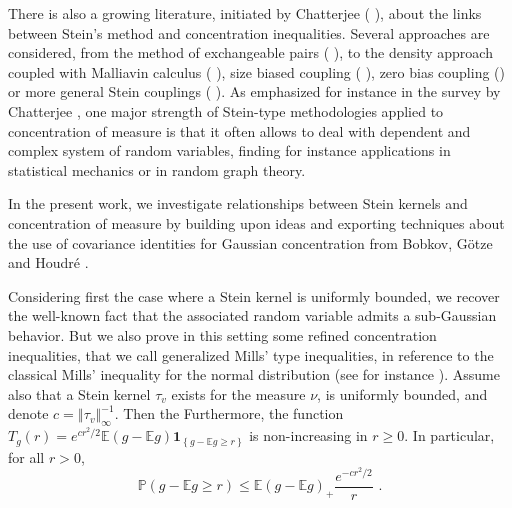 \documentclass[11pt]{article}
\begin{document}
There is also a growing literature, initiated by Chatterjee (\cite{MR2288072}%
), about the links between Stein's method and concentration inequalities.
Several approaches are considered, from the method of exchangeable pairs (%
\cite{MR2288072,MR2683635, MR3189061,  MR3551202}%
), to the density approach coupled with Malliavin calculus (%
\cite{MR2556018, MR2568291, MR3380095, MR3352331}%
), size biased coupling (%
\cite{MR2773032,MR2763529,MR2832913,MR3758727}%
), zero bias coupling (\cite{MR3162712}) or more general Stein couplings (%
\cite{barbour2018central}). As emphasized for instance in the survey by
Chatterjee \cite{MR3727600}, one major strength of Stein-type methodologies
applied to concentration of measure is that it often allows to deal with
dependent and complex system of random variables, finding for instance
applications in statistical mechanics or in random graph theory.

In the present work, we investigate relationships between Stein kernels and
concentration of measure by building upon ideas and exporting techniques
about the use of covariance identities for Gaussian concentration from
Bobkov, G\"{o}tze and Houdr\'{e} \cite{MR1836739}.

Considering first the case where a Stein kernel is uniformly bounded, we
recover the well-known fact that the associated random variable admits a
sub-Gaussian behavior. But we also prove in this setting some refined
concentration inequalities, that we call generalized Mills' type
inequalities, in reference to the classical Mills' inequality for the normal
distribution (see for instance \cite{duembgen2010bounding}). Assume also
that a Stein kernel $\tau _{v}$ exists for the measure $\nu $, is uniformly
bounded, and denote $c=\left\Vert \tau _{v}\right\Vert _{\infty }^{-1}$.
Then the Furthermore, the function $T_{g}\left( r\right) =e^{cr^{2}/2}%
\mathbb{E}\left( g-\mathbb{E}g\right) \mathbf{1}_{\left\{ g-\mathbb{E}g\geq
r\right\} }$ is non-increasing in $r\geq 0$. In particular, for all $r>0$,%
\begin{equation}
\mathbb{P}\left( g-\mathbb{E}g\geq r\right) \leq \mathbb{E}\left( g-\mathbb{E%
}g\right) _{+}\frac{e^{-cr^{2}/2}}{r}\text{ .}  \label{intro_concen_droite}
\end{equation}
\end{document}
